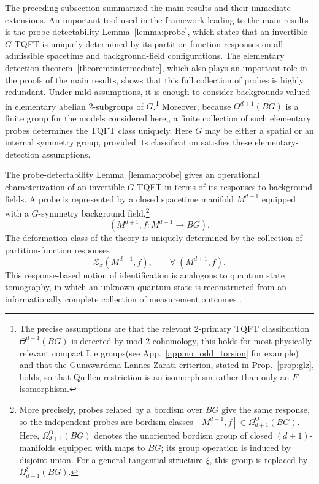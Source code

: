 \documentclass[aps,prx,reprint,superscriptaddress,twocolumn,amsmath,amssymb,amsfonts, nofootinbib]{revtex4-2}
\theoremstyle{apsstyle}
\begin{document}
The preceding subsection summarized the main results and their immediate extensions. An important tool used in the framework leading to the main results is the probe-detectability Lemma~\ref{lemma:probe}, which states that an invertible $G$-TQFT is uniquely determined by its partition-function responses on all admissible spacetime and background-field configurations. The elementary detection theorem~\ref{theorem:intermediate}, which also plays an important role in the proofs of the main results, shows that this full collection of probes is highly redundant. Under mild assumptions, it is enough to consider backgrounds valued in elementary abelian $2$-subgroups of $G$.\footnote{The precise assumptions are that the relevant $2$-primary TQFT classification $\Theta^{d+1}(BG)$ is detected by mod-$2$ cohomology, this holds for most physically relevant compact Lie groups(see App.~\ref{app:no_odd_torsion} for example) and that the Gunawardena-Lannes-Zarati criterion, stated in Prop.~\ref{prop:glz}, holds, so that Quillen restriction is an isomorphism rather than only an $F$-isomorphism.} Moreover, because $\Theta^{d+1}(BG)$ is a finite group for the models considered here,, a finite collection of such elementary probes determines the TQFT class uniquely. Here $G$ may be either a spatial or an internal symmetry group, provided its classification satisfies these elementary-detection assumptions.

\bigskip 

The probe-detectability Lemma~\ref{lemma:probe} gives an operational characterization of an invertible $G$-TQFT in terms of its responses to background fields. A probe is represented by a closed spacetime manifold $M^{d+1}$ equipped with a $G$-symmetry background field,\footnote{ More precisely, probes related by a bordism over $BG$ give the same response, so the independent probes are bordism classes $\left[M^{d+1},f\right]\in\Omega_{d+1}^{\mathrm O}(BG)$. Here, $\Omega_{d+1}^{\mathrm O}(BG)$ denotes the unoriented bordism group of closed $(d+1)$-manifolds equipped with maps to $BG$; its group operation is induced by disjoint union. For a general tangential structure $\xi$, this group is replaced by $\Omega_{d+1}^{\xi}(BG)$.}
\begin{equation}
\left(M^{d+1},f:M^{d+1}\longrightarrow BG\right).
\label{eq:probe_bordism_group}
\end{equation}
The deformation class of the theory is uniquely determined by the collection of partition-function responses
\begin{equation*}
\mathcal{Z}_x\left(M^{d+1},f\right), \qquad
\forall\; \left(M^{d+1},f\right).
\end{equation*}
This response-based notion of identification is analogous to quantum state tomography, in which an unknown quantum state is reconstructed from an informationally complete collection of measurement outcomes \cite{VogelRisken1989,JamesEtAl2001,LvovskyRaymer2009}.
\end{document}
